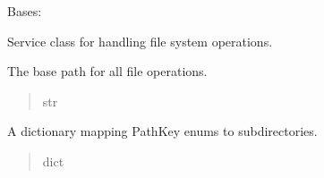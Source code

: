 \documentclass[letterpaper,10pt,english]{sphinxmanual}
\begin{document}
\begin{fulllineitems}
\label{\detokenize{application.services:application.services.FileSystemService.FileSystemService}}
\pysigstartsignatures
{}
\pysigstopsignatures
\sphinxAtStartPar
Bases: 

\sphinxAtStartPar
Service class for handling file system operations.

\begin{fulllineitems}
\label{\detokenize{application.services:application.services.FileSystemService.FileSystemService.base_path}}
\pysigstartsignatures
{}
\pysigstopsignatures
\sphinxAtStartPar
The base path for all file operations.
\begin{quote}\begin{description}
\sphinxAtStartPar
str

\end{description}\end{quote}

\end{fulllineitems}


\begin{fulllineitems}
\label{\detokenize{application.services:application.services.FileSystemService.FileSystemService.paths}}
\pysigstartsignatures
{}
\pysigstopsignatures
\sphinxAtStartPar
A dictionary mapping PathKey enums to subdirectories.
\begin{quote}\begin{description}
\sphinxAtStartPar
dict

\end{description}\end{quote}

\end{fulllineitems}


\end{fulllineitems}
\end{document}

